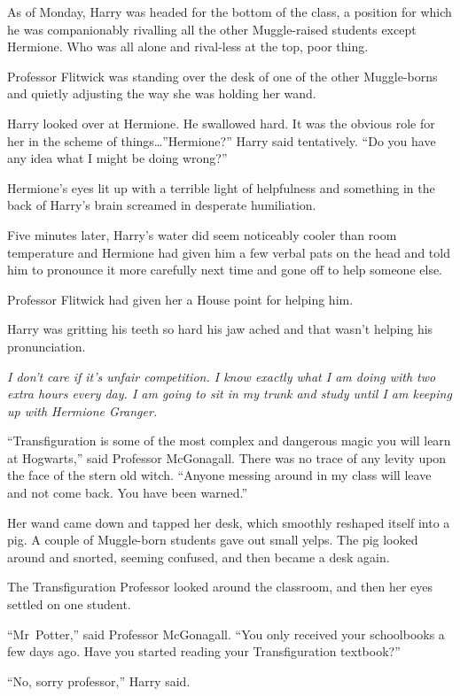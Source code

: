 As of Monday, Harry was headed for the bottom of the class, a position for which he was companionably rivalling all the other Muggle-raised students except Hermione. Who was all alone and rival-less at the top, poor thing.

Professor Flitwick was standing over the desk of one of the other Muggle-borns and quietly adjusting the way she was holding her wand.

Harry looked over at Hermione. He swallowed hard. It was the obvious role for her in the scheme of things…”Hermione?” Harry said tentatively. “Do you have any idea what I might be doing wrong?”

Hermione’s eyes lit up with a terrible light of helpfulness and something in the back of Harry’s brain screamed in desperate humiliation.

Five minutes later, Harry’s water did seem noticeably cooler than room temperature and Hermione had given him a few verbal pats on the head and told him to pronounce it more carefully next time and gone off to help someone else.

Professor Flitwick had given her a House point for helping him.

Harry was gritting his teeth so hard his jaw ached and that wasn’t helping his pronunciation.

\emph{I don’t care if it’s unfair competition. I know exactly what I am doing with two extra hours every day. I am going to sit in my trunk and study until I am keeping up with Hermione Granger.}

\later

“Transfiguration is some of the most complex and dangerous magic you will learn at Hogwarts,” said Professor McGonagall. There was no trace of any levity upon the face of the stern old witch. “Anyone messing around in my class will leave and not come back. You have been warned.”

Her wand came down and tapped her desk, which smoothly reshaped itself into a pig. A couple of Muggle-born students gave out small yelps. The pig looked around and snorted, seeming confused, and then became a desk again.

The Transfiguration Professor looked around the classroom, and then her eyes settled on one student.

“Mr~Potter,” said Professor McGonagall. “You only received your schoolbooks a few days ago. Have you started reading your Transfiguration textbook?”

“No, sorry professor,” Harry said.

